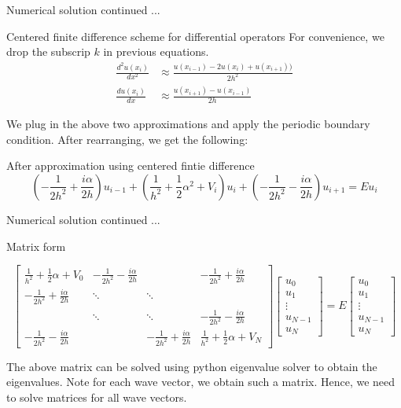 \documentclass{beamer}
\begin{document}
\begin{frame}{Numerical solution continued ...}
    \begin{block}{Centered finite difference scheme for differential operators}
    For convenience, we drop the subscrip $k$ in previous equations.
    \begin{align*} 
\frac{d^2u(x_i)}{dx^2} & \approx \frac{u(x_{i-1})-2u(x_i)+u(x_{i+1}))}{2h^2} \\
\frac{du(x_i)}{dx} & \approx \frac{u(x_{i+1})-u(x_{i-1})}{2h}
\end{align*}
\end{block}

We plug in the above two approximations and apply the periodic boundary condition. After rearranging, we get the following: 

\begin{block}{After approximation using centered fintie difference}
$$(-\frac{1}{2h^2}+\frac{i\alpha}{2h})u_{i-1} + (\frac{1}{h^2}+\frac{1}{2}\alpha^2+V_i)u_i+(-\frac{1}{2h^2}-\frac{i\alpha}{2h})u_{i+1} = Eu_i  $$
\end{block}

\end{frame}

\begin{frame}{Numerical solution continued ...}
\begin{block}{Matrix form}

\begin{equation} 
\left[ \begin{matrix}
\frac{1}{h^2}+\frac{1}{2}\alpha+V_0 & -\frac{1}{2h^2}-\frac{i\alpha}{2h} & & -\frac{1}{2h^2}+\frac{i\alpha}{2h}\\
-\frac{1}{2h^2}+\frac{i\alpha}{2h} & \ddots & \ddots & \\
& \ddots & \ddots & -\frac{1}{2h^2}-\frac{i\alpha}{2h} \\
-\frac{1}{2h^2}-\frac{i\alpha}{2h} & & -\frac{1}{2h^2}+\frac{i\alpha}{2h} & \frac{1}{h^2}+\frac{1}{2}\alpha+V_{N} \end{matrix} \right]
\begin{bmatrix}
    u_{0}  \\
    u_{1}  \\
    \vdots  \\
    u_{N-1}\\
    u_{N}
    \end{bmatrix} = E\begin{bmatrix}
    u_{0}  \\
    u_{1}  \\
    \vdots  \\
    u_{N-1}\\
    u_{N}
    \end{bmatrix}
\end{equation}

\end{block}

The above matrix can be solved using python eigenvalue solver to obtain the eigenvalues. 
Note for each wave vector, we obtain such a matrix. Hence, we need to solve matrices for all wave vectors. 

\end{frame}
\end{document}

